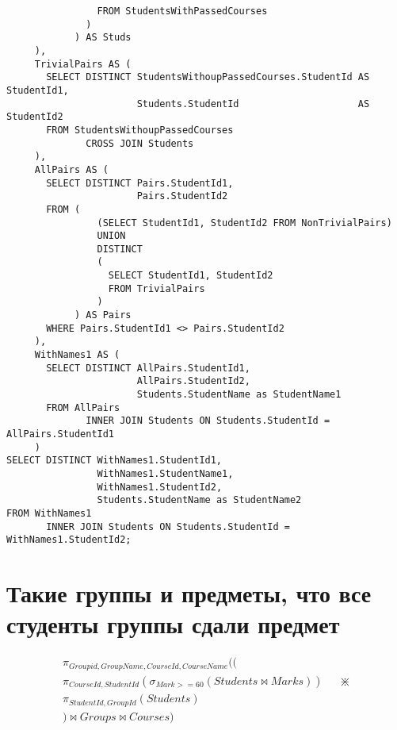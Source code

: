 \documentclass{article}
\begin{document}
\begin{verbatim}
                FROM StudentsWithPassedCourses
              )
            ) AS Studs
     ),
     TrivialPairs AS (
       SELECT DISTINCT StudentsWithoupPassedCourses.StudentId AS StudentId1,
                       Students.StudentId                     AS StudentId2
       FROM StudentsWithoupPassedCourses
              CROSS JOIN Students
     ),
     AllPairs AS (
       SELECT DISTINCT Pairs.StudentId1,
                       Pairs.StudentId2
       FROM (
                (SELECT StudentId1, StudentId2 FROM NonTrivialPairs)
                UNION
                DISTINCT
                (
                  SELECT StudentId1, StudentId2
                  FROM TrivialPairs
                )
            ) AS Pairs
       WHERE Pairs.StudentId1 <> Pairs.StudentId2
     ),
     WithNames1 AS (
       SELECT DISTINCT AllPairs.StudentId1,
                       AllPairs.StudentId2,
                       Students.StudentName as StudentName1
       FROM AllPairs
              INNER JOIN Students ON Students.StudentId = AllPairs.StudentId1
     )
SELECT DISTINCT WithNames1.StudentId1,
                WithNames1.StudentName1,
                WithNames1.StudentId2,
                Students.StudentName as StudentName2
FROM WithNames1
       INNER JOIN Students ON Students.StudentId = WithNames1.StudentId2;
\end{verbatim}

	\section{Такие группы и предметы, что все студенты группы сдали предмет}
	
	\begin{align*}
	 \pi_{Groupid, GroupName, CourseId, CourseName}(( \\
	 	 \pi_{CourseId, StudentId}(\sigma_{Mark >= 60} (Students \bowtie Marks)) && \divideontimes\\
	 	 	 \pi_{StudentId, GroupId}(Students)\\
	 	 ) \bowtie Groups \bowtie Courses
	 )
	\end{align*}
\end{document}
